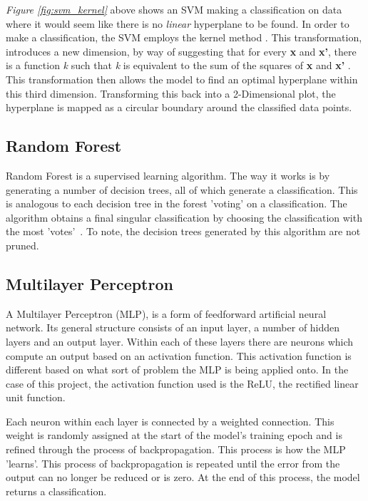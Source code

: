 \documentclass[11pt, a4paper]{article}
\begin{document}
\emph{Figure \ref{fig:svm_kernel}} above shows an SVM making a classification on data where it would seem like there is no \emph{linear} hyperplane to be found. In order to make a classification, the SVM employs the kernel method \cite{ray2017svm}. This transformation, introduces a new dimension, by way of suggesting that for every \textbf{x} and \textbf{x'}, there is a function \emph{k} such that \emph{k} is equivalent to the sum of the squares of \textbf{x} and \textbf{x'} \cite{hofmann2008kernel}. This transformation then allows the model to find an optimal hyperplane within this third dimension. Transforming this back into a 2-Dimensional plot, the hyperplane is mapped as a circular boundary around the classified data points.

\subsection{Random Forest}

Random Forest is a supervised learning algorithm. The way it works is by generating a number of decision trees, all of which generate a classification. This is analogous to each decision tree in the forest 'voting' on a classification. The algorithm obtains a final singular classification by choosing the classification with the most 'votes'~\cite{randforest}. To note, the decision trees generated by this algorithm are not pruned. 

\subsection{Multilayer Perceptron}

A Multilayer Perceptron (MLP), is a form of feedforward artificial neural network. Its general structure consists of an input layer, a number of hidden layers and an output layer. Within each of these layers there are neurons which compute an output based on an activation function. This activation function is different based on what sort of problem the MLP is being applied onto. In the case of this project, the activation function used is the ReLU, the rectified linear unit function.
 
Each neuron within each layer is connected by a weighted connection. This weight is randomly assigned at the start of the model's training epoch and is refined through the process of backpropagation. This process is how the MLP 'learns'. This process of backpropagation is repeated until the error from the output can no longer be reduced or is zero. At the end of this process, the model returns a classification. 
  
\end{document}
